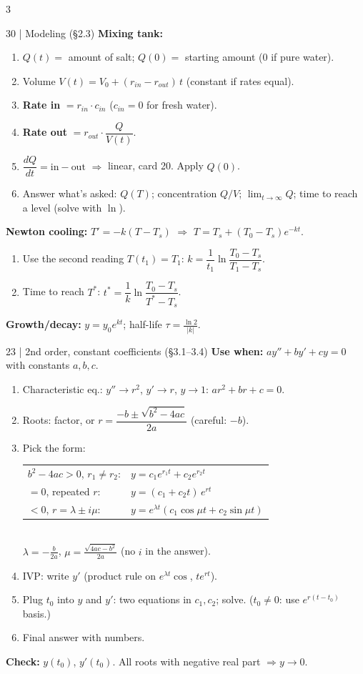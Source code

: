 \documentclass[8pt]{extarticle}
\newcommand{\key}[1]{\textcolor{grn}{\textbf{#1}}}
\newcommand{\when}[1]{\textcolor{amb}{\textbf{Use when:}} #1\par}
\newcommand{\chk}[1]{\par\textcolor{grn}{\textbf{Check:}} #1}
\begin{document}
\begin{multicols*}{3}
\begin{card}{30 \;|\; Modeling (\S2.3)}
\key{Mixing tank:}
\begin{enumerate}
\item $Q(t)=$ amount of salt; $Q(0)=$ starting amount ($0$ if pure water).
\item Volume $V(t)=V_0+(r_{in}-r_{out})\,t$ (constant if rates equal).
\item \textbf{Rate in} $=r_{in}\cdot c_{in}$ \;($c_{in}=0$ for fresh water).
\item \textbf{Rate out} $=r_{out}\cdot\dfrac{Q}{V(t)}$.
\item $\dfrac{dQ}{dt}=\text{in}-\text{out}$ $\Rightarrow$ linear, card 20. Apply $Q(0)$.
\item Answer what's asked: $Q(T)$; concentration $Q/V$; $\lim_{t\to\infty}Q$; time to reach a level (solve with $\ln$).
\end{enumerate}
\key{Newton cooling:} $T'=-k(T-T_s)$ $\Rightarrow$ $T=T_s+(T_0-T_s)e^{-kt}$.
\begin{enumerate}
\item Use the second reading $T(t_1)=T_1$: \;$k=\dfrac1{t_1}\ln\dfrac{T_0-T_s}{T_1-T_s}$.
\item Time to reach $T^*$: \;$t^*=\dfrac1k\ln\dfrac{T_0-T_s}{T^*-T_s}$.
\end{enumerate}
\key{Growth/decay:} $y=y_0e^{kt}$; half-life $\tau=\frac{\ln2}{|k|}$.
\end{card}

\begin{card}{23 \;|\; 2nd order, constant coefficients (\S3.1--3.4)}
\when{$ay''+by'+cy=0$ with constants $a,b,c$.}
\begin{enumerate}
\item Characteristic eq.: $y''\to r^2$, $y'\to r$, $y\to1$: \;$ar^2+br+c=0$.
\item Roots: factor, or $r=\dfrac{-b\pm\sqrt{b^2-4ac}}{2a}$ (careful: $-b$).
\item Pick the form:\\[0.5pt]
\begin{tabular}{@{}l@{\;}l@{}}
$b^2-4ac>0$, $r_1\ne r_2$: & $y=c_1e^{r_1t}+c_2e^{r_2t}$\\
$=0$, repeated $r$: & $y=(c_1+c_2t)\,e^{rt}$\\
$<0$, $r=\lambda\pm i\mu$: & $y=e^{\lambda t}(c_1\cos\mu t+c_2\sin\mu t)$
\end{tabular}\\
$\lambda=-\frac{b}{2a}$, \;$\mu=\frac{\sqrt{4ac-b^2}}{2a}$ (no $i$ in the answer).
\item IVP: write $y'$ (product rule on $e^{\lambda t}\cos$, $te^{rt}$).
\item Plug $t_0$ into $y$ and $y'$: two equations in $c_1,c_2$; solve. ($t_0\ne0$: use $e^{r(t-t_0)}$ basis.)
\item Final answer with numbers.
\end{enumerate}
\chk{$y(t_0)$, $y'(t_0)$. All roots with negative real part $\Rightarrow y\to0$.}
\end{card}


\end{multicols*}
\end{document}
